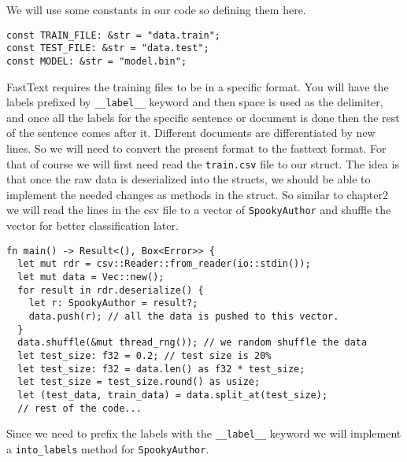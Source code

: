\documentclass{book}
\begin{document}
We will use some constants in our code so defining them here.

\begin{lstlisting}[caption={chapter5\\/fasttext\\-model\\/src\\/main\\.rs}, basicstyle=\small]
const TRAIN_FILE: &str = "data.train";
const TEST_FILE: &str = "data.test";
const MODEL: &str = "model.bin";
\end{lstlisting}

FastText requires the training files to be in a specific format. You will have the labels prefixed by \lstinline{__label__} keyword and then space is used as the delimiter, and once all the labels for the specific sentence or document is done then the rest of the sentence comes after it. Different documents are differentiated by new lines. So we will need to convert the present format to the fasttext format. For that of course we will first need read the \lstinline{train.csv} file to our struct. The idea is that once the raw data is deserialized into the structs, we should be able to implement the needed changes as methods in the struct. So similar to chapter2 we will read the lines in the csv file to a vector of \lstinline{SpookyAuthor} and shuffle the vector for better classification later.

\begin{lstlisting}[caption={chapter5\\/fasttext\\-model\\/src\\/main\\.rs}, basicstyle=\small]
fn main() -> Result<(), Box<Error>> {
  let mut rdr = csv::Reader::from_reader(io::stdin());
  let mut data = Vec::new();
  for result in rdr.deserialize() {
    let r: SpookyAuthor = result?;
    data.push(r); // all the data is pushed to this vector.
  }
  data.shuffle(&mut thread_rng()); // we random shuffle the data
  let test_size: f32 = 0.2; // test size is 20%
  let test_size: f32 = data.len() as f32 * test_size;
  let test_size = test_size.round() as usize;
  let (test_data, train_data) = data.split_at(test_size);
  // rest of the code...
\end{lstlisting}

Since we need to prefix the labels with the \lstinline{__label__} keyword we will implement a \lstinline{into_labels} method for \lstinline{SpookyAuthor}.
\end{document}
